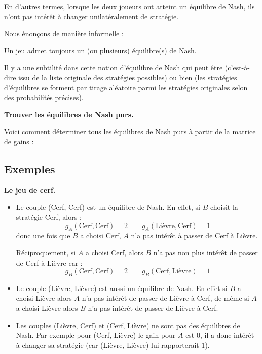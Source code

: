 \documentclass[11pt,class=report,crop=false]{standalone}
\begin{document}
En d'autres termes, lorsque les deux joueurs ont atteint un équilibre de Nash, ils n'ont pas intérêt à changer unilatéralement de stratégie.

Nous énonçons de manière informelle :
\begin{theoreme}
	Un jeu admet toujours un (ou plusieurs) équilibre(s) de Nash.
\end{theoreme}

Il y a une subtilité dans cette notion d'équilibre de Nash qui peut être  (c'est-à-dire issu de la liste originale des stratégies possibles) ou bien  (les stratégies d'équilibres se forment par tirage aléatoire parmi les stratégies originales selon des probabilités précises).

\bigskip
\textbf{Trouver les équilibres de Nash purs.}

Voici comment déterminer tous les équilibres de Nash purs à partir de la matrice de gains :




\subsection{Exemples}

\textbf{Le jeu de cerf.}




\begin{itemize}
	\item Le couple (Cerf, Cerf) est un équilibre de Nash.
	En effet, si $B$ choisit la stratégie Cerf, alors :
	$$g_A(\text{Cerf}, \text{Cerf}) = 2 \qquad g_A(\text{Lièvre}, \text{Cerf}) = 1$$
	donc une fois que $B$ a choisi Cerf, $A$ n'a pas intérêt à passer de Cerf à Lièvre.
	
	Réciproquement, si $A$ a choisi Cerf, alors $B$ n'a pas non plus intérêt de passer de Cerf à Lièvre car :
	$$g_B(\text{Cerf}, \text{Cerf}) = 2 \qquad g_B(\text{Cerf}, \text{Lièvre}) = 1$$	
	
	
	\item Le couple (Lièvre, Lièvre) est aussi un équilibre de Nash. En effet si $B$ a choisi Lièvre alors $A$ n'a pas intérêt de passer de Lièvre à Cerf, de même si $A$ a choisi Lièvre alors $B$ n'a pas intérêt de passer de Lièvre à Cerf.
	
    \item Les couples (Lièvre, Cerf) et (Cerf, Lièvre) ne sont pas des équilibres de Nash. Par exemple pour (Cerf, Lièvre) le gain pour $A$ est $0$, il a donc intérêt à changer sa stratégie (car (Lièvre, Lièvre) lui rapporterait $1$).
\end{itemize}
\end{document}
